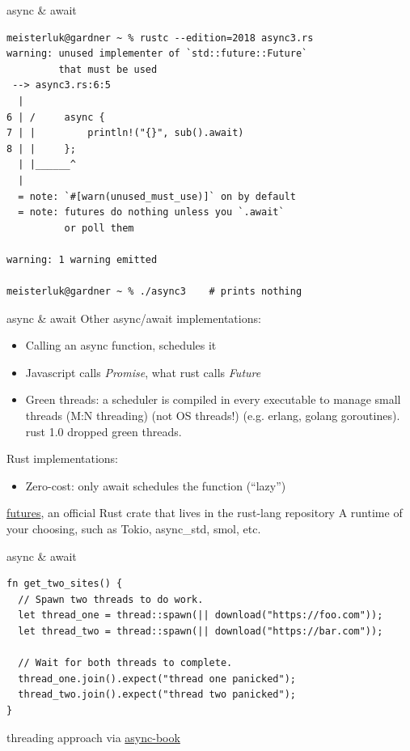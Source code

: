 \documentclass{beamer}
\begin{document}
\begin{frame}[fragile]{async \& await}
  \begin{verbatim}
meisterluk@gardner ~ % rustc --edition=2018 async3.rs
warning: unused implementer of `std::future::Future`
         that must be used
 --> async3.rs:6:5
  |
6 | /     async {
7 | |         println!("{}", sub().await)
8 | |     };
  | |______^
  |
  = note: `#[warn(unused_must_use)]` on by default
  = note: futures do nothing unless you `.await`
          or poll them

warning: 1 warning emitted

meisterluk@gardner ~ % ./async3    # prints nothing
  \end{verbatim}
\end{frame}

\begin{frame}[fragile]{async \& await}
  Other async/await implementations:
  \begin{itemize}
    \item Calling an async function, schedules it
    \item Javascript calls \emph{Promise}, what rust calls \emph{Future}
    \item Green threads: a scheduler is compiled in every executable to manage small threads (M:N threading) (not OS threads!) (e.g. erlang, golang goroutines). rust 1.0 dropped green threads.
  \end{itemize}
  Rust implementations:
  \begin{itemize}
    \item Zero-cost: only await schedules the function (\enquote{lazy})
  \end{itemize}


    \href{https://crates.io/crates/futures}{futures}, an official Rust crate that lives in the rust-lang repository
    A runtime of your choosing, such as Tokio, async_std, smol, etc.

\end{frame}

\begin{frame}[fragile]{async \& await}
  \begin{verbatim}
fn get_two_sites() {
  // Spawn two threads to do work.
  let thread_one = thread::spawn(|| download("https://foo.com"));
  let thread_two = thread::spawn(|| download("https://bar.com"));

  // Wait for both threads to complete.
  thread_one.join().expect("thread one panicked");
  thread_two.join().expect("thread two panicked");
}
  \end{verbatim}
  threading approach via \href{https://rust-lang.github.io/async-book/01_getting_started/02_why_async.html}{async-book}
\end{frame}
\end{document}
